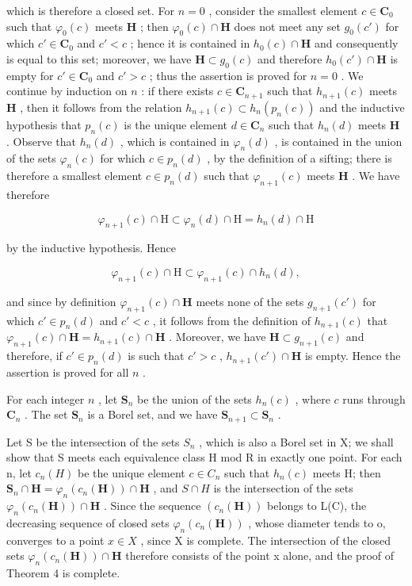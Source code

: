 which is therefore a closed set. For \(n = 0\) , consider the smallest element \(c \in \mathbf{C}_0\) such that \(\varphi_0(c)\) meets \(\mathbf{H}\) ; then \(\varphi_0(c) \cap \mathbf{H}\) does not meet any set \(g_0(c')\) for which \(c' \in \mathbf{C}_0\) and \(c' < c\) ; hence it is contained in \(h_0(c) \cap \mathbf{H}\) and consequently is equal to this set; moreover, we have \(\mathbf{H} \subset g_0(c)\) and therefore \(h_0(c') \cap \mathbf{H}\) is empty for \(c' \in \mathbf{C}_0\) and \(c' > c\) ; thus the assertion is proved for \(n = 0\) . We continue by induction on \(n\) : if there exists \(c \in \mathbf{C}_{n+1}\) such that \(h_{n+1}(c)\) meets \(\mathbf{H}\) , then it follows from the relation \(h_{n+1}(c) \subset h_n(p_n(c))\) and the inductive hypothesis that \(p_n(c)\) is the unique element \(d \in \mathbf{C}_n\) such that \(h_n(d)\) meets \(\mathbf{H}\) . Observe that \(h_n(d)\) , which is contained in \(\varphi_n(d)\) , is contained in the union of the sets \(\varphi_n(c)\) for which \(c \in p_n(d)\) , by the definition of a sifting; there is therefore a smallest element \(c \in p_n(d)\) such that \(\varphi_{n+1}(c)\) meets \(\mathbf{H}\) . We have therefore

\[
\varphi_ {n + 1} (c) \cap \mathrm{H} \subset \varphi_ {n} (d) \cap \mathrm{H} = h _ {n} (d) \cap \mathrm{H}
\]

by the inductive hypothesis. Hence

\[
\varphi_ {n + 1} (c) \cap \mathrm{H} \subset \varphi_ {n + 1} (c) \cap h _ {n} (d),
\]

and since by definition \(\varphi_{n+1}(c) \cap \mathbf{H}\) meets none of the sets \(g_{n+1}(c')\) for which \(c' \in p_n(d)\) and \(c' < c\) , it follows from the definition of \(h_{n+1}(c)\) that \(\varphi_{n+1}(c) \cap \mathbf{H} = h_{n+1}(c) \cap \mathbf{H}\) . Moreover, we have \(\mathbf{H} \subset g_{n+1}(c)\) and therefore, if \(c' \in p_n(d)\) is such that \(c' > c\) , \(h_{n+1}(c') \cap \mathbf{H}\) is empty. Hence the assertion is proved for all \(n\) .

For each integer \(n\) , let \(\mathbf{S}_n\) be the union of the sets \(h_n(c)\) , where \(c\) runs through \(\mathbf{C}_n\) . The set \(\mathbf{S}_n\) is a Borel set, and we have \(\mathbf{S}_{n+1} \subset \mathbf{S}_n\) .

Let S be the intersection of the sets \(S_{n}\) , which is also a Borel set in X; we shall show that S meets each equivalence class H mod R in exactly one point. For each n, let \(c_{n}(H)\) be the unique element \(c \in C_{n}\) such that \(h_{n}(c)\) meets H; then \(\mathbf{S}_{n} \cap \mathbf{H} = \varphi_{n}(c_{n}(\mathbf{H})) \cap \mathbf{H}\) , and \(S \cap H\) is the intersection of the sets \(\varphi_{n}(c_{n}(\mathbf{H})) \cap \mathbf{H}\) . Since the sequence \((c_{n}(\mathbf{H}))\) belongs to L(C), the decreasing sequence of closed sets \(\varphi_{n}(c_{n}(\mathbf{H}))\) , whose diameter tends to o, converges to a point \(x \in X\) , since X is complete. The intersection of the closed sets \(\varphi_{n}(c_{n}(\mathbf{H})) \cap \mathbf{H}\) therefore consists of the point x alone, and the proof of Theorem 4 is complete.


